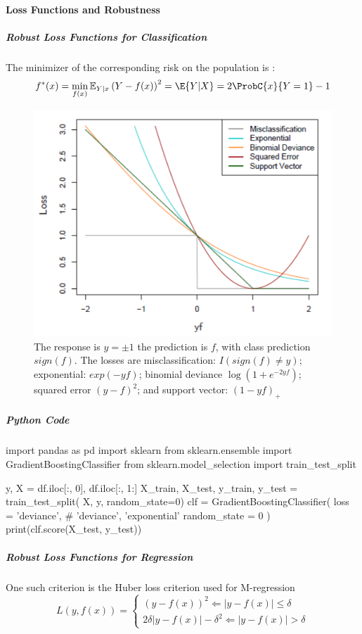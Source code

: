 \paragraph{Loss Functions and Robustness}
\subparagraph{Robust Loss Functions for Classification}
The minimizer of the corresponding risk on the population is :
$$ f^{*}(x)=\min\limits_{f(x)}\mathbb{E}_{Y|x}\left(Y-f(x)\right)^{2} = \E{Y|X}=2\ProbC{x}{Y=1}
-1$$
\begin{figure}[H]
	\begin{center}
		\includegraphics[width=.6\textwidth]{./chap/1chap/7sec/images/2_LossFunction.PNG}
	\end{center}
	\caption{The response is $y=\pm 1$ the prediction is $f$, with class prediction $sign(f)$.
	The losses are misclassification: $I(sign(f)\neq y)$; exponential: $exp(-yf)$; binomial
	deviance $\log(1+e^{-2yf})$; squared error $(y-f)^{2}$; and support vector: $(1-yf)_{+}$}
	\label{fig:2_LossFunction}
\end{figure}
\subparagraph{Python Code}
\begin{python}
import pandas as pd
import sklearn
from sklearn.ensemble import GradientBoostingClassifier
from sklearn.model_selection import train_test_split

y, X = df.iloc[:, 0], df.iloc[:, 1:]
X_train, X_test, y_train, y_test = train_test_split(
    X, y, random_state=0)
clf = GradientBoostingClassifier(
   loss = 'deviance', # {'deviance', 'exponential'}
   random_state = 0
)
print(clf.score(X_test, y_test))
\end{python}
\subparagraph{Robust Loss Functions for Regression}
One such criterion is the Huber loss criterion used for M-regression
$$ L(y,f(x))=
\begin{cases}
	\left(y-f(x)\right)^{2} \Leftarrow |y-f(x)|\leq \delta \\
	2\delta|y-f(x)|-\delta^{2} \Leftarrow |y-f(x)|> \delta
\end{cases}
$$
